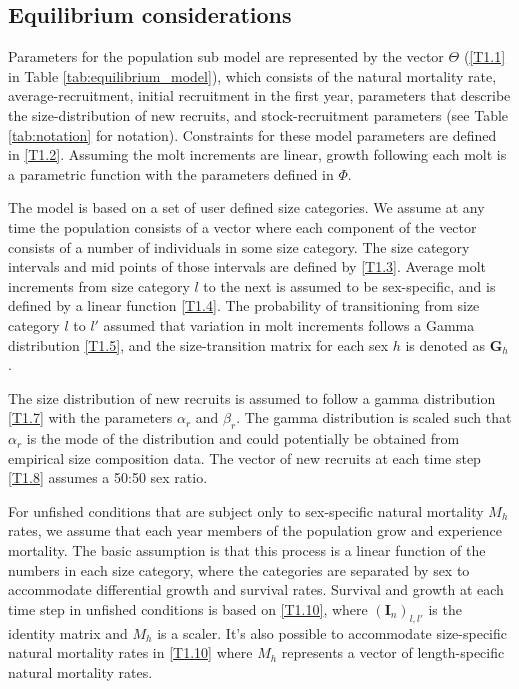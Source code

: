 \documentclass[12pt,letterpaper]{article}
\begin{document}
    \subsection*{Equilibrium considerations} %
    \label{sub:equilibrium_considerations}
    Parameters for the population sub model are represented by the vector $\Theta$ (\ref{T1.1} in Table \ref{tab:equilibrium_model}), which consists of the natural mortality rate, average-recruitment, initial recruitment in the first year, parameters that describe the size-distribution of new recruits, and stock-recruitment parameters (see Table \ref{tab:notation} for notation).  Constraints for these model parameters are defined in \eqref{T1.2}.  Assuming the molt increments are linear, growth following each molt is a parametric function with the parameters defined in $\Phi$.

    The model is based on a set of user defined size categories. We assume at any time the population consists of a vector where each component of the vector consists of a number of individuals in some size category. The size category intervals and mid points of those intervals are defined by \eqref{T1.3}.  Average molt increments from size category $l$ to the next is assumed to be sex-specific, and is defined by a linear function \eqref{T1.4}.  The probability of transitioning from  size category $l$ to $l'$ assumed that variation in molt increments follows a Gamma distribution \eqref{T1.5}, and the size-transition matrix for each sex $h$ is denoted as $\pmb{G}_h$.

    The size distribution of new recruits is assumed to follow a gamma distribution \eqref{T1.7} with the parameters $\alpha_r$ and $\beta_r$.  The gamma distribution is scaled such that $\alpha_r$ is the mode of the distribution and could potentially be obtained from empirical size composition data.  The vector of new recruits at each time step \eqref{T1.8} assumes a 50:50 sex ratio.

    For unfished conditions that are subject only to sex-specific natural mortality $M_h$ rates, we assume that each year members of the population grow and experience mortality.  The basic assumption is that this process is a linear function of the numbers in each size category, where the categories are separated by  sex to accommodate differential growth and survival rates.  Survival and growth at each time step in unfished conditions is based on \eqref{T1.10}, where $(\pmb{I}_n)_{l,l'}$ is the identity matrix and $M_h$ is a scaler. It's also possible to accommodate size-specific natural mortality rates in \eqref{T1.10} where $M_h$ represents a vector of length-specific natural mortality rates.
\end{document}
